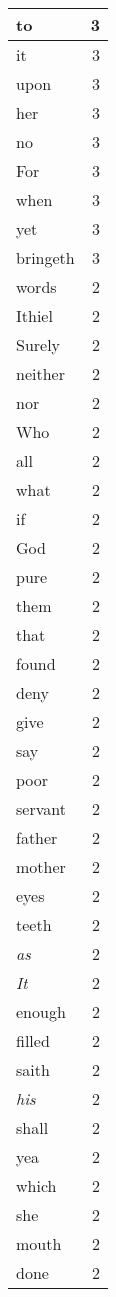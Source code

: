\begin{center}
\begin{longtable}{l|r}
to & 3\\ \hline 
it & 3\\ \hline 
upon & 3\\ \hline 
her & 3\\ \hline 
no & 3\\ \hline 
For & 3\\ \hline 
when & 3\\ \hline 
yet & 3\\ \hline 
bringeth & 3\\ \hline 
words & 2\\ \hline 
Ithiel & 2\\ \hline 
Surely & 2\\ \hline 
neither & 2\\ \hline 
nor & 2\\ \hline 
Who & 2\\ \hline 
all & 2\\ \hline 
what & 2\\ \hline 
if & 2\\ \hline 
God & 2\\ \hline 
pure & 2\\ \hline 
them & 2\\ \hline 
that & 2\\ \hline 
found & 2\\ \hline 
deny & 2\\ \hline 
give & 2\\ \hline 
say & 2\\ \hline 
poor & 2\\ \hline 
servant & 2\\ \hline 
father & 2\\ \hline 
mother & 2\\ \hline 
eyes & 2\\ \hline 
teeth & 2\\ \hline 
\emph{as} & 2\\ \hline 
\emph{It} & 2\\ \hline 
enough & 2\\ \hline 
filled & 2\\ \hline 
saith & 2\\ \hline 
\emph{his} & 2\\ \hline 
shall & 2\\ \hline 
yea & 2\\ \hline 
which & 2\\ \hline 
she & 2\\ \hline 
mouth & 2\\ \hline 
done & 2\\ \hline 

\end{longtable}
\end{center}
